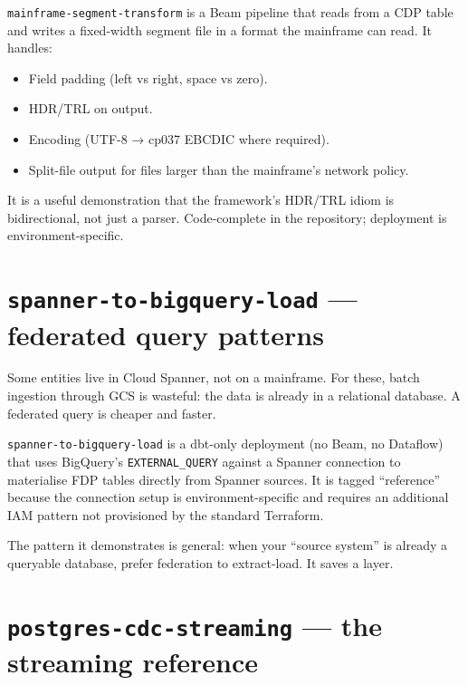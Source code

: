 \documentclass[
  11pt,
  british,
  oneside]{book}
\providecommand{\tightlist}{%
  \setlength{\itemsep}{0pt}\setlength{\parskip}{0pt}}
\begin{document}
\texttt{mainframe-segment-transform} is a Beam pipeline that reads from
a CDP table and writes a fixed-width segment file in a format the
mainframe can read. It handles:

\begin{itemize}
\tightlist
\item
  Field padding (left vs right, space vs zero).
\item
  HDR/TRL on output.
\item
  Encoding (UTF-8 → cp037 EBCDIC where required).
\item
  Split-file output for files larger than the mainframe's network
  policy.
\end{itemize}

It is a useful demonstration that the framework's HDR/TRL idiom is
bidirectional, not just a parser. Code-complete in the repository;
deployment is environment-specific.

\hypertarget{spanner-to-bigquery-load-federated-query-patterns}{%
\section{\texorpdfstring{\texttt{spanner-to-bigquery-load} --- federated
query
patterns}{spanner-to-bigquery-load --- federated query patterns}}\label{spanner-to-bigquery-load-federated-query-patterns}}

Some entities live in Cloud Spanner, not on a mainframe. For these,
batch ingestion through GCS is wasteful: the data is already in a
relational database. A federated query is cheaper and faster.

\texttt{spanner-to-bigquery-load} is a dbt-only deployment (no Beam, no
Dataflow) that uses BigQuery's \texttt{EXTERNAL\_QUERY} against a
Spanner connection to materialise FDP tables directly from Spanner
sources. It is tagged ``reference'' because the connection setup is
environment-specific and requires an additional IAM pattern not
provisioned by the standard Terraform.

The pattern it demonstrates is general: when your ``source system'' is
already a queryable database, prefer federation to extract-load. It
saves a layer.

\hypertarget{postgres-cdc-streaming-the-streaming-reference}{%
\section{\texorpdfstring{\texttt{postgres-cdc-streaming} --- the
streaming
reference}{postgres-cdc-streaming --- the streaming reference}}\label{postgres-cdc-streaming-the-streaming-reference}}
\end{document}

